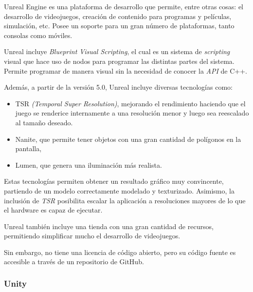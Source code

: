\documentclass[a4paper,11pt]{book}
\begin{document}
Unreal Engine \cite{unreal} es una plataforma de desarrollo que permite, entre otras cosas: el desarrollo de videojuegos, creación de contenido para programas y películas, simulación, etc. Posee un soporte para un gran número de plataformas, tanto consolas como móviles.

\bigskip

Unreal incluye \textit{Blueprint Visual Scripting}, el cual es un sistema de \textit{scripting} visual que hace uso de nodos para programar las distintas partes del sistema. Permite programar de manera visual sin la necesidad de conocer la \textit{API} de C++.

\bigskip

Además, a partir de la versión 5.0, Unreal incluye diversas tecnologías como: 

\begin{itemize}
   \item TSR \textit{(Temporal Super Resolution)}, mejorando el rendimiento haciendo que el juego se renderice internamente a una resolución menor y luego sea reescalado al tamaño deseado.
   \item Nanite, que permite tener objetos con una gran cantidad de polígonos en la pantalla, 
   \item Lumen, que genera una iluminación más realista. %
\end{itemize}

Estas tecnologías permiten obtener un resultado gráfico muy convincente, partiendo de un modelo correctamente modelado y texturizado. Asimismo, la inclusión de \textit{TSR} posibilita escalar la aplicación a resoluciones mayores de lo que el hardware es capaz de ejecutar.

\bigskip

Unreal también incluye una tienda con una gran cantidad de recursos, permitiendo simplificar mucho el desarrollo de videojuegos.

\bigskip

Sin embargo, no tiene una licencia de código abierto, pero su código fuente es accesible a través de un repositorio de GitHub. %

\subsubsection{Unity}
\end{document}
